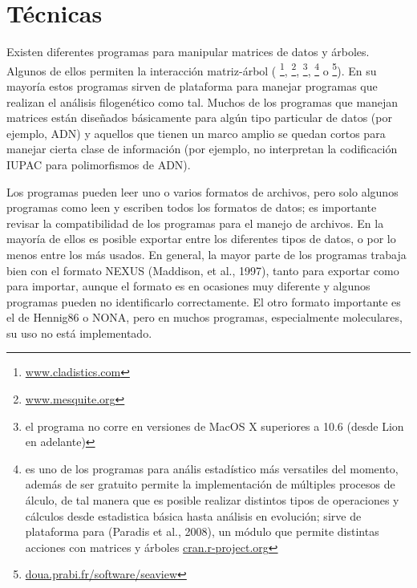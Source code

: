 \section*{T\'ecnicas}

Existen diferentes programas para manipular matrices de datos y \'arboles. Algunos de ellos permiten la interacci\'on matriz-\'arbol (
\footnote{\url{www.cladistics.com}}, 
\footnote{\url{www.mesquite.org}}, 
\footnote{el programa no corre en versiones de MacOS X superiores a 10.6 (desde Lion en adelante)}, 
\footnote{ es uno de los programas para an\'alis estad\'istico m\'as versatiles del momento, adem\'as de ser gratuito permite la implementaci\'on de m\'ultiples procesos de \'alculo, de tal manera que es posible realizar distintos tipos de operaciones y c\'alculos desde estadistica b\'asica hasta an\'alisis en evoluci\'on; sirve de plataforma para  %
(Paradis et al., 2008), un m\'odulo que permite distintas acciones con matrices y \'arboles 
\url{cran.r-project.org}}  o 
\footnote{\url{doua.prabi.fr/software/seaview}}). En su mayor\'ia estos programas sirven de plataforma para manejar programas que realizan el an\'alisis filogen\'etico como tal. Muchos de los programas que manejan matrices est\'an dise\~nados b\'asicamente para alg\'un tipo particular de datos (por ejemplo, ADN) y aquellos que tienen un marco amplio se quedan cortos para manejar cierta clase de informaci\'on (por ejemplo, no interpretan la codificaci\'on IUPAC para polimorfismos de ADN).

Los programas pueden leer uno o varios formatos de archivos, pero solo algunos programas como  leen y escriben todos los formatos de datos; es importante revisar la compatibilidad de los programas para el manejo de archivos. En la mayor\'ia de ellos es posible exportar entre los diferentes tipos de datos, o por lo menos entre los m\'as usados. En general, la mayor parte de los programas trabaja bien con el formato NEXUS (Maddison, et al., 1997), 
tanto para exportar como para importar, aunque el formato es en ocasiones muy diferente y algunos programas pueden no identificarlo correctamente. El otro formato importante es el de Hennig86 o NONA, pero en muchos programas, especialmente moleculares, su uso no est\'a implementado.

